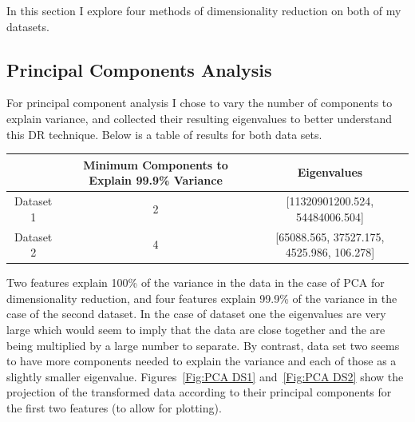 In this section I explore four methods of dimensionality reduction on both of my datasets.

\subsection{Principal Components Analysis}\label{subsec:principal-components-analysis}
For principal component analysis I chose to vary the number of components to explain variance, and collected their resulting eigenvalues to better understand this DR technique.
Below is a table of results for both data sets.
\begin{center}
    \begin{tabular}{|c| c |c|}
        \hline
        & Minimum Components to Explain 99.9\% Variance & Eigenvalues                               \\
        \hline
        \hline
        Dataset 1 & 2                                             & [11320901200.524, 54484006.504]           \\
        \hline
        Dataset 2 & 4                                             & [65088.565, 37527.175, 4525.986, 106.278] \\
        \hline
    \end{tabular}
\end{center}
Two features explain 100\% of the variance in the data in the case of PCA for dimensionality reduction, and four features explain
99.9\% of the variance in the case of the second dataset.
In the case of dataset one the eigenvalues are very large which would seem to imply that the data are close together and
the are being multiplied by a large number to separate.
By contrast, data set two seems to have more components needed to explain the variance and each of those as a slightly smaller eigenvalue.
Figures~\ref{Fig:PCA DS1} and~\ref{Fig:PCA DS2} show the projection of the transformed data according to their principal
components for the first two features (to allow for plotting).
